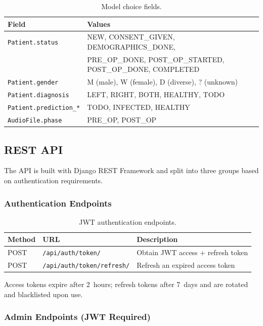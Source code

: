 \documentclass[12pt,a4paper]{article}
\begin{document}
\begin{table}[H]
\centering
\caption{Model choice fields.}
\label{tab:enums}
\begin{tabular}{l p{9cm}}
\toprule
\textbf{Field} & \textbf{Values} \\
\midrule
\texttt{Patient.status}     & NEW, CONSENT\_GIVEN, DEMOGRAPHICS\_DONE,\\
                            & PRE\_OP\_DONE, POST\_OP\_STARTED, POST\_OP\_DONE, COMPLETED \\
\texttt{Patient.gender}     & M (male), W (female), D (diverse), ? (unknown) \\
\texttt{Patient.diagnosis}  & LEFT, RIGHT, BOTH, HEALTHY, TODO \\
\texttt{Patient.prediction\_*} & TODO, INFECTED, HEALTHY \\
\texttt{AudioFile.phase}    & PRE\_OP, POST\_OP \\
\bottomrule
\end{tabular}
\end{table}

\subsection{REST API}
\label{sec:api}

The API is built with Django REST Framework and split into three groups based on
authentication requirements.

\subsubsection{Authentication Endpoints}

\begin{table}[H]
\centering
\caption{JWT authentication endpoints.}
\begin{tabular}{l l l}
\toprule
\textbf{Method} & \textbf{URL} & \textbf{Description} \\
\midrule
POST & \texttt{/api/auth/token/}         & Obtain JWT access + refresh token \\
POST & \texttt{/api/auth/token/refresh/}  & Refresh an expired access token \\
\bottomrule
\end{tabular}
\end{table}

Access tokens expire after 2~hours; refresh tokens after 7~days and are rotated
and blacklisted upon use.

\subsubsection{Admin Endpoints (JWT Required)}
\end{document}
